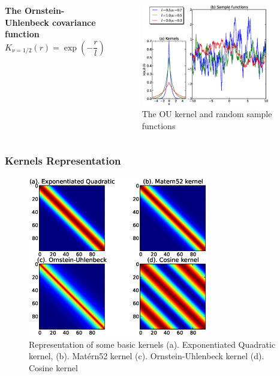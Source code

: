 \documentclass{beamer}
\begin{document}
\begin{frame}
\begin{columns}[c]
\textbf{The Ornstein-Uhlenbeck covariance function}
\begin{equation} \label{eq:OU}
K_{\nu=1/2}(r)=	\exp \left(-\frac{r}{l} \right)
\end{equation}
\begin{figure}[t]
	\centering
		\includegraphics[width=0.9\textwidth,keepaspectratio]{diagrams/OU_cov.eps}
		\caption[The OU kernel and random sample functions]
		{The OU kernel and random sample functions}
	\label{fig:OU_covariance}
\end{figure}
\end{columns}
\end{frame}

\begin{frame}
\frametitle{Kernels Representation}
\begin{figure}[t]
	\centering
		\includegraphics[width=0.7\textwidth,keepaspectratio]{diagrams/DifferentKernels.eps}
		\caption[Representation of some basic kernels ]
		{Representation of some basic kernels (a). Exponentiated Quadratic kernel, 
		(b). Mat{\'e}rn52 kernel (c). Ornstein-Uhlenbeck kernel (d). Cosine kernel  }
	\label{fig:DifferentKernels}
\end{figure}
\end{frame}
\end{document}
